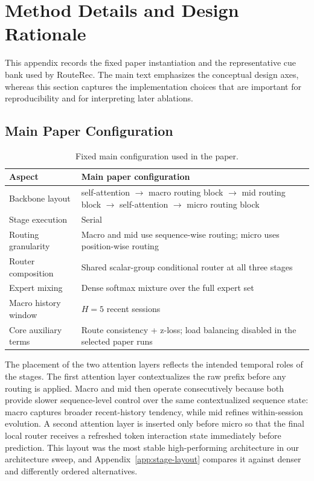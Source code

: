 \documentclass[sigconf,review,anonymous]{acmart}
\begin{document}
\nobalance
\clearpage
\appendix

\section{Method Details and Design Rationale}
\label{app:method-details}
This appendix records the fixed paper instantiation and the representative cue bank used by RouteRec. The main text emphasizes the conceptual design axes, whereas this section captures the implementation choices that are important for reproducibility and for interpreting later ablations.

\subsection{Main Paper Configuration}

\begin{table}[t]
  \centering
  \caption{Fixed main configuration used in the paper.}
  \label{tab:appendix-main-setting}
  \footnotesize
  \setlength{\tabcolsep}{4pt}
  \begin{tabularx}{\columnwidth}{@{}>{\raggedright\arraybackslash}X>{\raggedright\arraybackslash}X@{}}
    \toprule
    Aspect & Main paper configuration \\
    \midrule
    Backbone layout & self-attention $\rightarrow$ macro routing block $\rightarrow$ mid routing block $\rightarrow$ self-attention $\rightarrow$ micro routing block \\
    Stage execution & Serial \\
    Routing granularity & Macro and mid use sequence-wise routing; micro uses position-wise routing \\
    Router composition & Shared scalar-group conditional router at all three stages \\
    Expert mixing & Dense softmax mixture over the full expert set \\
    Macro history window & $H=5$ recent sessions \\
    Core auxiliary terms & Route consistency + z-loss; load balancing disabled in the selected paper runs \\
    \bottomrule
  \end{tabularx}
\end{table}

The placement of the two attention layers reflects the intended temporal roles of the stages. The first attention layer contextualizes the raw prefix before any routing is applied. Macro and mid then operate consecutively because both provide slower sequence-level control over the same contextualized sequence state: macro captures broader recent-history tendency, while mid refines within-session evolution. A second attention layer is inserted only before micro so that the final local router receives a refreshed token interaction state immediately before prediction. This layout was the most stable high-performing architecture in our architecture sweep, and Appendix~\ref{app:stage-layout} compares it against denser and differently ordered alternatives.
\end{document}
